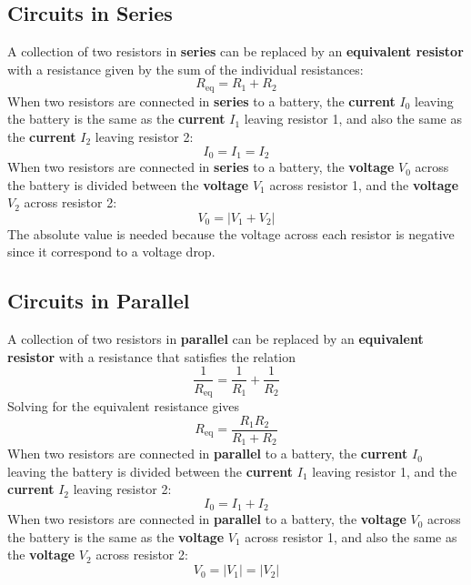\subsection{Circuits in Series}
A collection of two resistors in \textbf{series} can be replaced by an \textbf{equivalent resistor} with a resistance given by the sum of the individual resistances:
\begin{equation} \label{eq.03.RSeries}
	R_{\text{eq}} = R_{1} + R_{2}
\end{equation}
When two resistors are connected in \textbf{series} to a battery, the \textbf{current} $I_{0}$ leaving the battery is the same as the \textbf{current} $I_{1}$ leaving resistor 1, and also the same as the \textbf{current} $I_{2}$ leaving resistor 2:
\begin{equation} \label{eq.03.ISeries}
	I_{0} = I_{1} = I_{2}
\end{equation}
When two resistors are connected in \textbf{series} to a battery, the \textbf{voltage} $V_{0}$ across the battery is divided between the \textbf{voltage} $V_{1}$ across resistor 1, and the \textbf{voltage} $V_{2}$ across resistor 2:
\begin{equation} \label{eq.03.VSeries}
	V_{0} = \left| V_{1} + V_{2} \right|
\end{equation}
The absolute value is needed because the voltage across each resistor is negative since it correspond to a voltage drop.
\subsection{Circuits in Parallel}
A collection of two resistors in \textbf{parallel} can be replaced by an \textbf{equivalent resistor} with a resistance that satisfies the relation
\begin{equation}
	\frac{1}{R_{\text{eq}}} = \frac{1}{R_{1}} + \frac{1}{R_{2}}
\end{equation}
Solving for the equivalent resistance gives
\begin{equation} \label{eq.03.RParallel}
	R_{\text{eq}} = \frac{R_{1} R_{2}}{R_{1} + R_{2}}
\end{equation}
When two resistors are connected in \textbf{parallel} to a battery, the \textbf{current} $I_{0}$ leaving the battery is divided between the \textbf{current} $I_{1}$ leaving resistor 1, and the \textbf{current} $I_{2}$ leaving resistor 2:
\begin{equation} \label{eq.03.IParallel}
	I_{0} = I_{1} + I_{2}
\end{equation}
When two resistors are connected in \textbf{parallel} to a battery, the \textbf{voltage} $V_{0}$ across the battery is the same as the \textbf{voltage} $V_{1}$ across resistor 1, and also the same as the \textbf{voltage} $V_{2}$ across resistor 2:
\begin{equation} \label{eq.03.VParallel}
	V_{0} = \left| V_{1} \right| = \left| V_{2} \right|
\end{equation}
